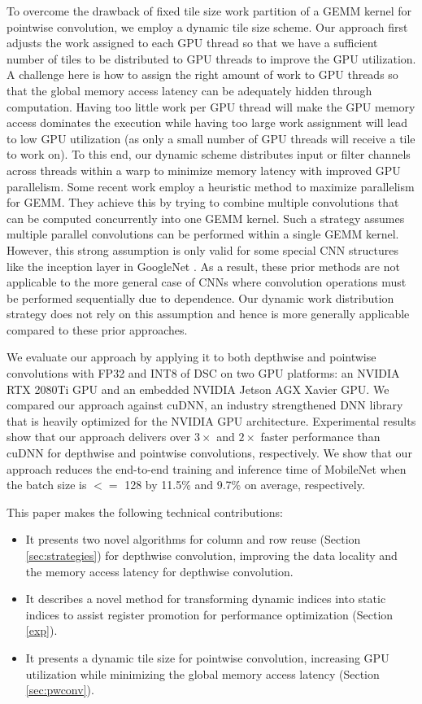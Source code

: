 To overcome the drawback of fixed tile size work partition of a GEMM kernel for pointwise convolution, we employ a dynamic tile size
scheme. Our approach first adjusts the work assigned to each GPU thread so that we have a sufficient number of tiles to be distributed to GPU
threads to improve the GPU utilization. A challenge here is how to assign the right amount of work to GPU threads so that the global memory
access latency can be adequately hidden through computation. Having too little work per GPU thread will make the GPU memory access
dominates the execution while having too large work assignment will lead to low GPU utilization (as only a small number of GPU threads will
receive a tile to work on). To this end, our dynamic scheme distributes input or filter channels across threads within a warp to minimize
memory latency with improved GPU parallelism. Some recent work \cite{li2019coordinated,pourghassemi2020limits} employ a heuristic method
to maximize parallelism for GEMM. They achieve this by trying to combine multiple convolutions that can be computed concurrently into one
GEMM kernel. Such a strategy assumes multiple parallel convolutions can be performed within a single GEMM kernel. However, this strong
assumption is only valid for some special CNN structures like the inception layer in GoogleNet \cite{szegedy2015going}. As a result, these
prior methods are not applicable to the more general case of CNNs where convolution operations must be performed sequentially due to
dependence. Our dynamic work distribution strategy does not rely on this assumption and hence is more generally applicable compared to
these prior approaches.

We evaluate our approach by applying it to both depthwise and pointwise convolutions with FP32 and INT8 of DSC on two GPU platforms: an NVIDIA RTX 2080Ti GPU
and an embedded NVIDIA Jetson AGX Xavier GPU. We compared our approach against cuDNN, an industry strengthened DNN library that is heavily
optimized for the NVIDIA GPU architecture. Experimental results show that our approach delivers over $3\times$ and $2\times$ faster
performance than cuDNN for depthwise and pointwise convolutions, respectively. We show that our approach reduces the end-to-end training
and inference time of MobileNet \cite{Sandler_2018_CVPR,howard2019searching} when the batch size is $<=$ 128 by 11.5\% and 9.7\% on average, respectively.



This paper makes the following technical contributions:
\begin{itemize}
    \item It presents two novel algorithms for column and row reuse (Section \ref{sec:strategies}) for depthwise
        convolution, improving the data locality and the memory access latency for depthwise convolution.
    \item It describes a novel method for transforming dynamic indices into static indices to assist register promotion for performance
        optimization (Section \ref{exp}).
    \item It presents a dynamic tile size for pointwise convolution, increasing GPU utilization while minimizing the global memory
        access latency (Section \ref{sec:pwconv}).
\end{itemize}
